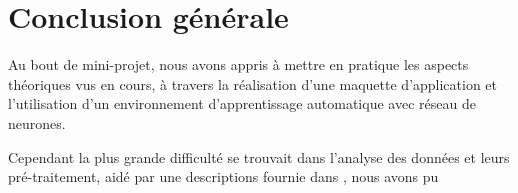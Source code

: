 \section{Conclusion générale}
Au bout de mini-projet, nous avons appris à mettre en pratique les aspects théoriques vus en cours, à travers la réalisation d'une maquette d'application et l'utilisation d'un environnement d'apprentissage automatique avec réseau de neurones.
\par 
Cependant la plus grande difficulté se trouvait dans l'analyse des données et leurs pré-traitement, aidé par une descriptions fournie dans \cite{datasetDetails}, nous avons pu 
